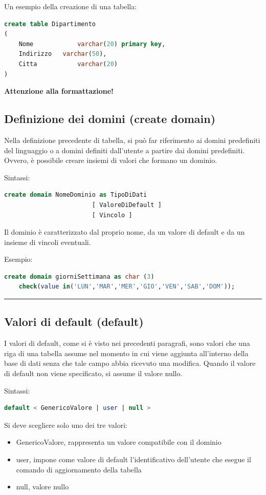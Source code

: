 \documentclass[a4paper]{article}
\newcommand{\longline}{\noindent\rule{\textwidth}{0.4pt}}
\begin{document}
	\noindent
	Un esempio della creazione di una tabella:
	\begin{lstlisting}[language=SQL]
create table Dipartimento
(
	Nome			varchar(20) primary key,
	Indirizzo	varchar(50),
	Citta			varchar(20)
) \end{lstlisting}
	\textbf{Attenzione alla formattazione!}\newpage
	
	\subsection{Definizione dei domini (\textsf{create domain})}
	
	Nella definizione precedente di tabella, si può far riferimento ai domini predefiniti del linguaggio o a domini definiti dall'utente a partire dai domini predefiniti. Ovvero, è possibile creare insiemi di valori che formano un dominio.\newline
	
	\noindent
	Sintassi:
	\begin{lstlisting}[language=SQL]
create domain NomeDominio as TipoDiDati
			  			[ ValoreDiDefault ]
			  			[ Vincolo ] \end{lstlisting}
	Il dominio è caratterizzato dal proprio nome, da un valore di default e da un insieme di vincoli eventuali.\newline
	
	\noindent
	Esempio:
	\begin{lstlisting}[language=SQL]
create domain giorniSettimana as char (3)
	check(value in('LUN','MAR','MER','GIO','VEN','SAB','DOM')); \end{lstlisting}
	
	\longline
	
	\subsection{Valori di default (\textsf{default})}
	
	I valori di default, come si è visto nei precedenti paragrafi, sono valori che una riga di una tabella assume nel momento in cui viene aggiunta all'interno della base di dati senza che tale campo abbia ricevuto una modifica. Quando il valore di default non viene specificato, si assume il valore nullo.\newline
	
	\noindent
	Sintassi:
	\begin{lstlisting}[language=SQL]
default < GenericoValore | user | null > \end{lstlisting}
	Si deve scegliere solo uno dei tre valori:
	\begin{itemize}
		\item \textsf{GenericoValore}, rappresenta un valore compatibile con il dominio
		\item \textsf{user}, impone come valore di default l'identificativo dell'utente che esegue il comando di aggiornamento della tabella
		\item \textsf{null}, valore nullo
	\end{itemize}\newpage
	
\end{document}
